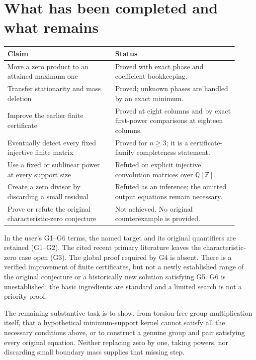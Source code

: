 \documentclass[11pt,a4paper,oneside]{report}
\theoremstyle{definition}
\theoremstyle{remark}
\newcommand{\Q}{\mathbb Q}
\newcommand{\Z}{\mathbb Z}
\begin{document}
\section{What has been completed and what remains}
\label{M05:sec:status}

\begin{center}
\begin{tabular}{P{0.43\linewidth}P{0.49\linewidth}}
\toprule
Claim & Status\\
\midrule
Move a zero product to an attained maximum one &
Proved with exact phase and coefficient bookkeeping.\\[4pt]
Transfer stationarity and mass deletion &
Proved; unknown phases are handled by an exact minimum.\\[4pt]
Improve the earlier finite certificate &
Proved at eight columns and by exact first-power comparisons
at eighteen columns.\\[4pt]
Eventually detect every fixed injective finite matrix &
Proved for $n\ge3$; it is a certificate-family completeness
statement.\\[4pt]
Use a fixed or sublinear power at every support size &
Refuted on explicit injective convolution matrices over $\Q[\Z]$.\\[4pt]
Create a zero divisor by discarding a small residual &
Refuted as an inference; the omitted output equations remain
necessary.\\[4pt]
Prove or refute the original characteristic-zero conjecture &
Not achieved. No original counterexample is provided.\\
\bottomrule
\end{tabular}
\end{center}

In the user's G1--G6 terms, the named target and its original
quantifiers are retained (G1--G2). The cited recent primary
literature leaves the characteristic-zero case open (G3).
The global proof required by G4 is absent. There is a verified
improvement of finite certificates, but not a newly established
range of the original conjecture or a historically new solution
satisfying G5. G6 is unestablished; the basic ingredients are
standard and a limited search is not a priority proof.

The remaining substantive task is to show, from torsion-free
group multiplication itself, that a hypothetical minimum-support
kernel cannot satisfy all the necessary conditions above, or to
construct a genuine group and pair satisfying every original
equation. Neither replacing zero by one, taking powers, nor
discarding small boundary mass supplies that missing step.
\end{document}
